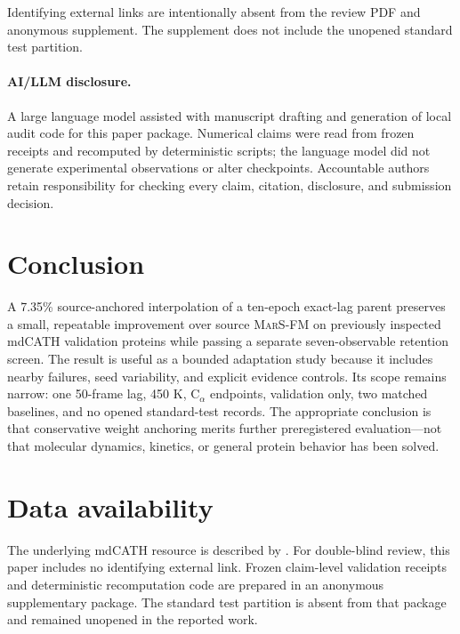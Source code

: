 \documentclass{article}
\newcommand{\marsfm}{\textsc{MarS-FM}}
\newcommand{\CA}{C$_\alpha$}
\begin{document}
Identifying external links are intentionally absent from the review PDF and anonymous supplement. The supplement does not include the unopened standard test partition.

\paragraph{AI/LLM disclosure.} A large language model assisted with manuscript drafting and generation of local audit code for this paper package. Numerical claims were read from frozen receipts and recomputed by deterministic scripts; the language model did not generate experimental observations or alter checkpoints. Accountable authors retain responsibility for checking every claim, citation, disclosure, and submission decision.

\section{Conclusion}

A 7.35\% source-anchored interpolation of a ten-epoch exact-lag parent preserves a small, repeatable improvement over source \marsfm{} on previously inspected mdCATH validation proteins while passing a separate seven-observable retention screen. The result is useful as a bounded adaptation study because it includes nearby failures, seed variability, and explicit evidence controls. Its scope remains narrow: one 50-frame lag, 450 K, \CA{} endpoints, validation only, two matched baselines, and no opened standard-test records. The appropriate conclusion is that conservative weight anchoring merits further preregistered evaluation---not that molecular dynamics, kinetics, or general protein behavior has been solved.

\newpage

\section*{Data availability}

The underlying mdCATH resource is described by \citet{mirarchi2024mdcath}. For double-blind review, this paper includes no identifying external link. Frozen claim-level validation receipts and deterministic recomputation code are prepared in an anonymous supplementary package. The standard test partition is absent from that package and remained unopened in the reported work.
\end{document}
